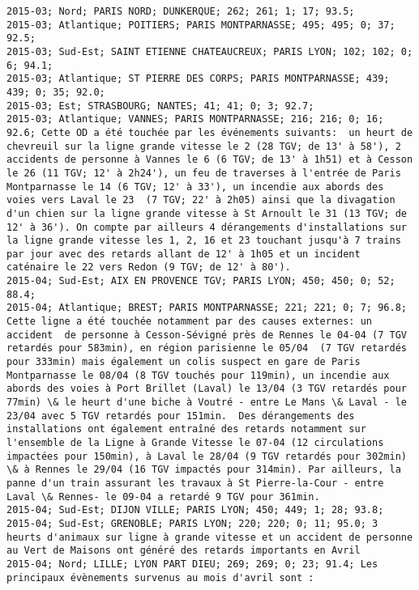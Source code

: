 \documentclass{article}
\begin{document}
\begin{Verbatim}[commandchars=\\\{\}]
2015-03; Nord; PARIS NORD; DUNKERQUE; 262; 261; 1; 17; 93.5; 
2015-03; Atlantique; POITIERS; PARIS MONTPARNASSE; 495; 495; 0; 37; 92.5; 
2015-03; Sud-Est; SAINT ETIENNE CHATEAUCREUX; PARIS LYON; 102; 102; 0; 6; 94.1; 
2015-03; Atlantique; ST PIERRE DES CORPS; PARIS MONTPARNASSE; 439; 439; 0; 35; 92.0; 
2015-03; Est; STRASBOURG; NANTES; 41; 41; 0; 3; 92.7; 
2015-03; Atlantique; VANNES; PARIS MONTPARNASSE; 216; 216; 0; 16; 92.6; Cette OD a été touchée par les événements suivants:  un heurt de chevreuil sur la ligne grande vitesse le 2 (28 TGV; de 13' à 58'), 2 accidents de personne à Vannes le 6 (6 TGV; de 13' à 1h51) et à Cesson le 26 (11 TGV; 12' à 2h24'), un feu de traverses à l'entrée de Paris Montparnasse le 14 (6 TGV; 12' à 33'), un incendie aux abords des voies vers Laval le 23  (7 TGV; 22' à 2h05) ainsi que la divagation d'un chien sur la ligne grande vitesse à St Arnoult le 31 (13 TGV; de 12' à 36'). On compte par ailleurs 4 dérangements d'installations sur la ligne grande vitesse les 1, 2, 16 et 23 touchant jusqu'à 7 trains par jour avec des retards allant de 12' à 1h05 et un incident caténaire le 22 vers Redon (9 TGV; de 12' à 80').
2015-04; Sud-Est; AIX EN PROVENCE TGV; PARIS LYON; 450; 450; 0; 52; 88.4; 
2015-04; Atlantique; BREST; PARIS MONTPARNASSE; 221; 221; 0; 7; 96.8; Cette ligne a été touchée notamment par des causes externes: un accident  de personne à Cesson-Sévigné près de Rennes le 04-04 (7 TGV retardés pour 583min), en région parisienne le 05/04  (7 TGV retardés pour 333min) mais également un colis suspect en gare de Paris Montparnasse le 08/04 (8 TGV touchés pour 119min), un incendie aux abords des voies à Port Brillet (Laval) le 13/04 (3 TGV retardés pour 77min) \& le heurt d'une biche à Voutré - entre Le Mans \& Laval - le 23/04 avec 5 TGV retardés pour 151min.  Des dérangements des installations ont également entraîné des retards notamment sur l'ensemble de la Ligne à Grande Vitesse le 07-04 (12 circulations impactées pour 150min), à Laval le 28/04 (9 TGV retardés pour 302min) \& à Rennes le 29/04 (16 TGV impactés pour 314min). Par ailleurs, la panne d'un train assurant les travaux à St Pierre-la-Cour - entre Laval \& Rennes- le 09-04 a retardé 9 TGV pour 361min.
2015-04; Sud-Est; DIJON VILLE; PARIS LYON; 450; 449; 1; 28; 93.8; 
2015-04; Sud-Est; GRENOBLE; PARIS LYON; 220; 220; 0; 11; 95.0; 3 heurts d'animaux sur ligne à grande vitesse et un accident de personne au Vert de Maisons ont généré des retards importants en Avril 
2015-04; Nord; LILLE; LYON PART DIEU; 269; 269; 0; 23; 91.4; Les principaux évènements survenus au mois d'avril sont :

\end{Verbatim}
\end{document}
